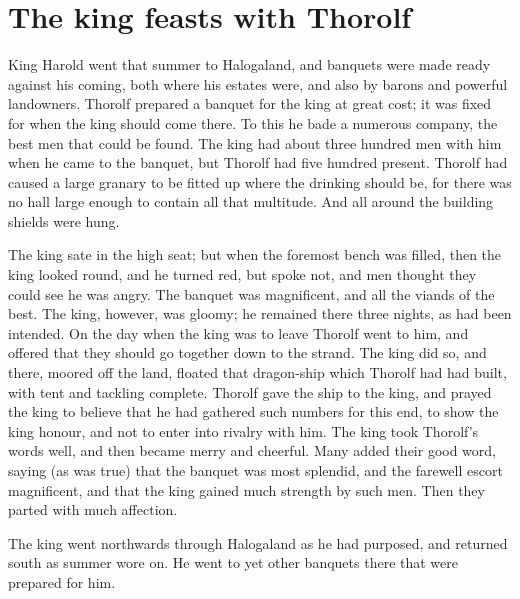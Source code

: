 \chapter{The king feasts with Thorolf}
King Harold went that summer to Halogaland, and banquets were made ready against his coming, both where his estates were, and also by barons and powerful landowners. Thorolf prepared a banquet for the king at great cost; it was fixed for when the king should come there. To this he bade a numerous company, the best men that could be found. The king had about three hundred men with him when he came to the banquet, but Thorolf had five hundred present. Thorolf had caused a large granary to be fitted up where the drinking should be, for there was no hall large enough to contain all that multitude. And all around the building shields were hung.

The king sate in the high seat; but when the foremost bench was filled, then the king looked round, and he turned red, but spoke not, and men thought they could see he was angry. The banquet was magnificent, and all the viands of the best. The king, however, was gloomy; he remained there three nights, as had been intended. On the day when the king was to leave Thorolf went to him, and offered that they should go together down to the strand. The king did so, and there, moored off the land, floated that dragon-ship which Thorolf had had built, with tent and tackling complete. Thorolf gave the ship to the king, and prayed the king to believe that he had gathered such numbers for this end, to show the king honour, and not to enter into rivalry with him. The king took Thorolf's words well, and then became merry and cheerful. Many added their good word, saying (as was true) that the banquet was most splendid, and the farewell escort magnificent, and that the king gained much strength by such men. Then they parted with much affection.

The king went northwards through Halogaland as he had purposed, and returned south as summer wore on. He went to yet other banquets there that were prepared for him.
